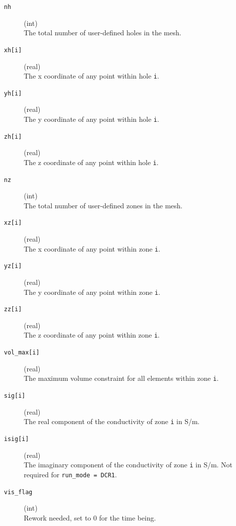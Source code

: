 \documentclass[a4paper,12pt]{article}
\begin{document}
\begin{description}
    \item[\texttt{nh}] (int)\hfill \\
    The total number of user-defined holes in the mesh.

    \item[\texttt{xh[i]}] (real)\hfill \\
    The x coordinate of any point within hole \texttt{i}.

    \item[\texttt{yh[i]}] (real)\hfill \\
    The y coordinate of any point within hole \texttt{i}.

    \item[\texttt{zh[i]}] (real)\hfill \\
    The z coordinate of any point within hole \texttt{i}.

    \item[\texttt{nz}] (int)\hfill \\
    The total number of user-defined zones in the mesh.

    \item[\texttt{xz[i]}] (real)\hfill \\
    The x coordinate of any point within zone \texttt{i}.

    \item[\texttt{yz[i]}] (real)\hfill \\
    The y coordinate of any point within zone \texttt{i}.

    \item[\texttt{zz[i]}] (real)\hfill \\
    The z coordinate of any point within zone \texttt{i}.

    \item[\texttt{vol\_max[i]}] (real)\hfill \\
    The maximum volume constraint for all elements within zone \texttt{i}.

    \item[\texttt{sig[i]}] (real)\hfill \\
    The real component of the conductivity of zone \texttt{i} in S/m.

    \item[\texttt{isig[i]}] (real)\hfill \\
    The imaginary component of the conductivity of zone \texttt{i} in S/m. Not required for \texttt{run\_mode = DCR1}.

    \item[\texttt{vis\_flag}] (int)\hfill \\
    Rework needed, set to 0 for the time being.


\end{description}
\end{document}
